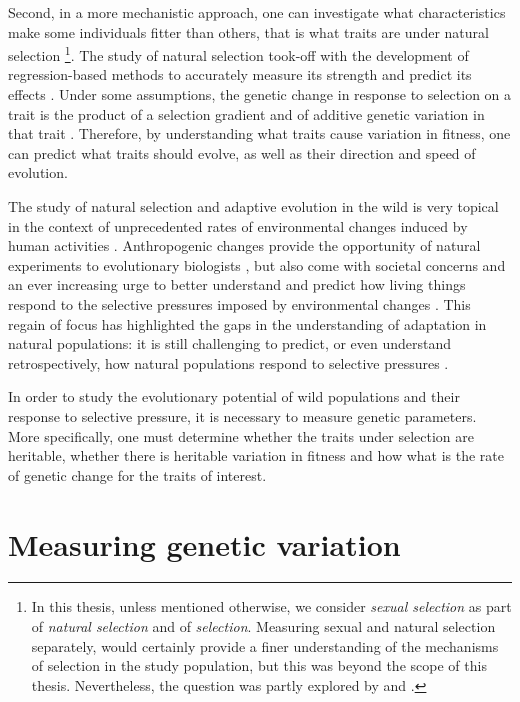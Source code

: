 Second, in a more mechanistic approach, one can investigate what characteristics make some individuals fitter than others, that is what traits are under natural selection \footnote{In this thesis, unless mentioned otherwise, we consider \emph{sexual selection} as part of \emph{natural selection} and of \emph{selection}. Measuring sexual and natural selection separately, would certainly provide a finer understanding of the mechanisms of selection in the study population, but this was beyond the scope of this thesis. Nevertheless, the question was partly explored by \cite{Garcia-Navas2016} and \cite{Garcia-Navas2015a}.}. The study of natural selection took-off with the development of regression-based methods to accurately measure its strength and predict its effects \parencite{Lande1979, Lande1983}. Under some assumptions, the genetic change in response to selection on a trait is the product of a selection gradient and of additive genetic variation in that trait \parencite{Lush1937}. Therefore, by understanding what traits cause variation in fitness, one can predict what traits should evolve, as well as their direction and speed of evolution. 

The study of natural selection and adaptive evolution in the wild is very topical in the context of unprecedented rates of environmental changes induced by human activities \parencite{parmesan2006}. Anthropogenic changes provide the opportunity of natural experiments to evolutionary biologists \parencite{Altermatt2016, Brookfield2016}, but also come with societal concerns and an ever increasing urge to better understand and predict how living things respond to the selective pressures imposed by environmental changes \parencite{McCarty2001, Shaw2013}. This regain of focus has highlighted the gaps in the understanding of adaptation in natural populations: it is still challenging to predict, or even understand retrospectively, how natural populations respond to selective pressures \parencite{Merila2001, Tafani2013, Shaw2013, Brookfield2016}.

In order to study the evolutionary potential of wild populations and their response to selective pressure, it is necessary to measure genetic parameters. More specifically, one must determine whether the traits under selection are heritable, whether there is heritable variation in fitness and how what is the rate of genetic change for the traits of interest. 

\section{Measuring genetic variation}
